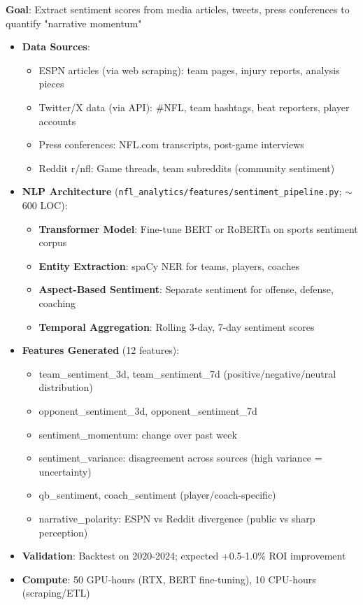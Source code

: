 \textbf{Goal}: Extract sentiment scores from media articles, tweets, press conferences to quantify "narrative momentum"

\begin{itemize}
  \item {} \textbf{Data Sources}:
  \begin{itemize}
    \item ESPN articles (via web scraping): team pages, injury reports, analysis pieces
    \item Twitter/X data (via API): \#NFL, team hashtags, beat reporters, player accounts
    \item Press conferences: NFL.com transcripts, post-game interviews
    \item Reddit r/nfl: Game threads, team subreddits (community sentiment)
  \end{itemize}
  \item {} \textbf{NLP Architecture} (\texttt{nfl\_analytics/features/sentiment\_pipeline.py}; $\sim$600 LOC):
  \begin{itemize}
    \item \textbf{Transformer Model}: Fine-tune BERT or RoBERTa on sports sentiment corpus
    \item \textbf{Entity Extraction}: spaCy NER for teams, players, coaches
    \item \textbf{Aspect-Based Sentiment}: Separate sentiment for offense, defense, coaching
    \item \textbf{Temporal Aggregation}: Rolling 3-day, 7-day sentiment scores
  \end{itemize}
  \item {} \textbf{Features Generated} (12 features):
  \begin{itemize}
    \item team\_sentiment\_3d, team\_sentiment\_7d (positive/negative/neutral distribution)
    \item opponent\_sentiment\_3d, opponent\_sentiment\_7d
    \item sentiment\_momentum: change over past week
    \item sentiment\_variance: disagreement across sources (high variance = uncertainty)
    \item qb\_sentiment, coach\_sentiment (player/coach-specific)
    \item narrative\_polarity: ESPN vs Reddit divergence (public vs sharp perception)
  \end{itemize}
  \item {} \textbf{Validation}: Backtest on 2020-2024; expected +0.5-1.0\% ROI improvement
  \item \textbf{Compute}: 50 GPU-hours (RTX, BERT fine-tuning), 10 CPU-hours (scraping/ETL)
\end{itemize}

